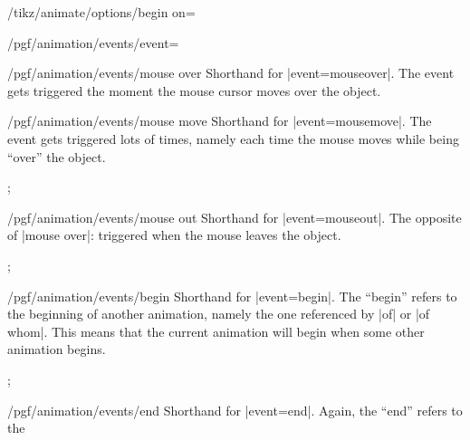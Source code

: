 \begin{key}{/tikz/animate/options/begin on=}
\begin{key}{/pgf/animation/events/event=}
\begin{key}{/pgf/animation/events/mouse over}
      Shorthand for |event=mouseover|. The event gets triggered the
      moment the mouse cursor moves over the object.
\begin{codeexample}[width=2cm]
\end{codeexample}
    \end{key}
    \begin{key}{/pgf/animation/events/mouse move}
      Shorthand for |event=mousemove|. The event gets triggered lots
      of times, namely each time the mouse moves while being ``over''
      the object.
\begin{codeexample}[width=2cm]
\tikz 
  ; 
\end{codeexample}
    \end{key}
    \begin{key}{/pgf/animation/events/mouse out}
      Shorthand for |event=mouseout|. The opposite of |mouse over|:
      triggered when the mouse leaves the object.
\begin{codeexample}[width=2cm]
\tikz 
  ; 
\end{codeexample}
    \end{key}
    \begin{key}{/pgf/animation/events/begin}
      Shorthand for |event=begin|. The ``begin'' refers to the
      beginning of another animation, namely the one referenced by
      |of| or |of whom|. This means that the current animation will
      begin when some other animation begins.
\begin{codeexample}[width=2cm]
\tikz 
  ; 
\end{codeexample}
    \end{key}
    \begin{key}{/pgf/animation/events/end}
      Shorthand for |event=end|. Again, the ``end'' refers to the

\end{key}
\end{key}
\end{key}
